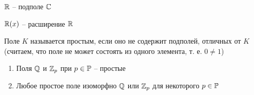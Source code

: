 \begin{exmpls}
	\item $ \mathbb{R} $ -- подполе $ \mathbb{C} $
	\item $ \mathbb{R}(x) $ -- расширение $ \mathbb{R} $
\end{exmpls}

\begin{definition}
	Поле $ K $ называется простым, если оно не содержит подполей, отличных от $ K $ \\
	(считаем, что поле не может состоять из одного элемента, т. е. $ 0 \ne 1 $)
\end{definition}

\begin{theorem}
	\hfill
	\begin{enumerate}
		\item Поля $ \mathbb{Q} $ и $ \mathbb{Z}_p $ при $ p \in \mathbb{P} $ -- простые

		\item Любое простое поле изоморфно $ \mathbb{Q} $ или $ \mathbb{Z}_p $ для некоторого $ p \in \mathbb{P} $
	\end{enumerate}
\end{theorem}

